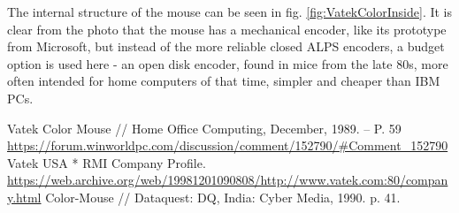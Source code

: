 \documentclass[11pt, a4paper]{article}
\begin{document}
The internal structure of the mouse can be seen in fig. \ref{fig:VatekColorInside}. It is clear from the photo that the mouse has a mechanical encoder, like its prototype from Microsoft, but instead of the more reliable closed ALPS encoders, a budget option is used here - an open disk encoder, found in mice from the late 80s, more often intended for home computers of that time, simpler and cheaper than IBM PCs.

\begin{thebibliography}{9}
 Vatek Color Mouse // Home Office Computing, December, 1989. -- P. 59 \url{https://forum.winworldpc.com/discussion/comment/152790/#Comment_152790}
 Vatek USA * RMI Company Profile. \url{https://web.archive.org/web/19981201090808/http://www.vatek.com:80/company.html}
 Color-Mouse // Dataquest: DQ, India: Cyber Media, 1990. p. 41.
\end{thebibliography}
\end{document}
